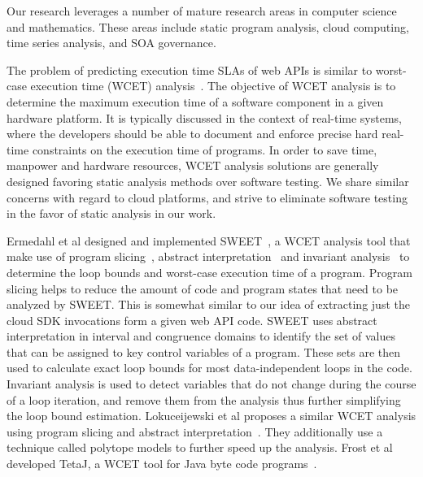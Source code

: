 Our research leverages a number of mature research areas in computer 
science and mathematics. These areas include static program analysis, 
cloud computing, time series analysis,
and SOA governance.

The problem of predicting execution time SLAs of web APIs 
is similar to worst-case execution
time (WCET) analysis~\cite{Wilhelm:2008:WEP:1347375.1347389}. The objective of WCET analysis is to determine the maximum execution time of a software component in a given hardware platform. It is 
typically discussed in the context of real-time systems, where the developers should be able to document
and enforce precise hard real-time constraints on the execution time of programs. In order to save time, 
manpower and hardware resources, WCET analysis solutions are generally designed favoring static
analysis methods over software testing. We share similar concerns with regard to cloud platforms,
and strive to eliminate software testing in the favor of static analysis in our work. 

Ermedahl et al designed and implemented SWEET~\cite{ermedahl2007loop}, a WCET analysis tool that make use of program slicing~\cite{Sandberg:2006:FWF:1134650.1134666},
 abstract interpretation~\cite{Cousot:1977:AIU:512950.512973} and invariant analysis~\cite{Muchnick:1998:ACD:286076} to determine the loop bounds and worst-case execution time 
 of a program. Program slicing helps to reduce the amount of code and program states that need to be 
 analyzed by SWEET. This is somewhat similar to our idea of extracting just the cloud SDK invocations form 
 a given web API code. SWEET uses abstract interpretation in interval and congruence domains to identify
 the set of values that can be assigned to key control variables of a program. These sets are then
 used to calculate exact loop bounds for most data-independent loops in the code. Invariant analysis  is
 used to detect variables that do not change during the course of a loop iteration, and remove them from
 the analysis thus further simplifying the loop bound estimation. Lokuceijewski et al proposes 
 a similar WCET analysis using program slicing and abstract interpretation~\cite{Lokuciejewski:2009:FPS:1545006.1545064}. They additionally use a technique
called polytope models to further speed up the analysis.  Frost et al developed TetaJ, a WCET
 tool for Java byte code programs~\cite{Frost:2011:WAJ:2043910.2043916}.
 
